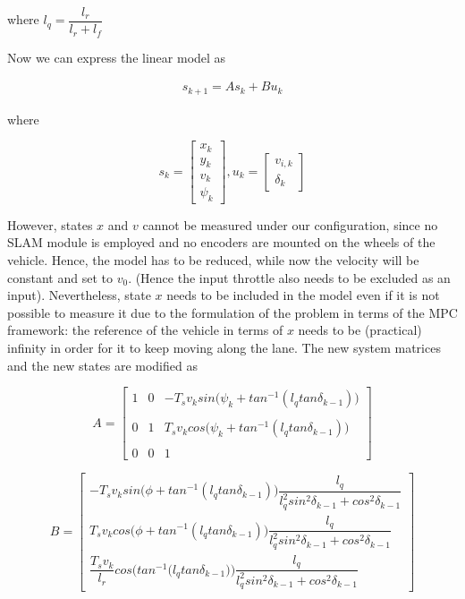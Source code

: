 where $l_q = \dfrac{l_r}{l_r + l_f}$


Now we can express the linear model as

\begin{align}
  s_{k+1} = A s_k + B u_k
\end{align}

where

\begin{equation}
  s_k=
  \begin{bmatrix}
    x_{k} \\
    y_{k} \\
    v_{k} \\
    \psi_{k}
  \end{bmatrix},
  u_k=
  \begin{bmatrix}
    v_{i,k} \\
    \delta_{k}
  \end{bmatrix}
\end{equation}


However, states $x$ and $v$ cannot be measured under our configuration, since
no SLAM module is employed and no encoders are mounted on the wheels of the
vehicle. Hence, the model has to be reduced, while now the velocity will be
constant and set to $v_0$. (Hence the input throttle also needs to be excluded
as an input). Nevertheless, state $x$ needs to be included in the
model even if it is not possible to measure it due to the formulation of the
problem in terms of the MPC framework: the reference of the vehicle in terms
of $x$ needs to be (practical) infinity in order for it to keep moving along
the lane. The new system matrices and the new states are modified as

\begin{equation}
  A =
  \begin{bmatrix}
    1 & 0 & -T_s v_k sin\Big(\psi_k + tan^{-1} (l_q tan\delta_{k-1})\Big) \\\\
    0 & 1 & T_s v_k cos\Big(\psi_k + tan^{-1} (l_q tan\delta_{k-1})\Big) \\\\
    0 & 0 & 1
  \end{bmatrix}
\end{equation}

\begin{equation}
  B =
  \begin{bmatrix}
    -T_s v_k sin\Big(\phi + tan^{-1} (l_q tan\delta_{k-1})\Big) \dfrac{l_q}{l_q^2 sin^2\delta_{k-1} + cos^2\delta_{k-1}} \\
    T_s v_k cos\Big(\phi + tan^{-1} (l_q tan\delta_{k-1})\Big) \dfrac{l_q}{l_q^2 sin^2\delta_{k-1} + cos^2\delta_{k-1}} \\
    \dfrac{T_s v_k}{l_r} cos\Bigg(tan^{-1} \Big(l_q tan\delta_{k-1}\Big)\Bigg) \dfrac{l_q}{l_q^2 sin^2\delta_{k-1} + cos^2\delta_{k-1}}
  \end{bmatrix}
\end{equation}


